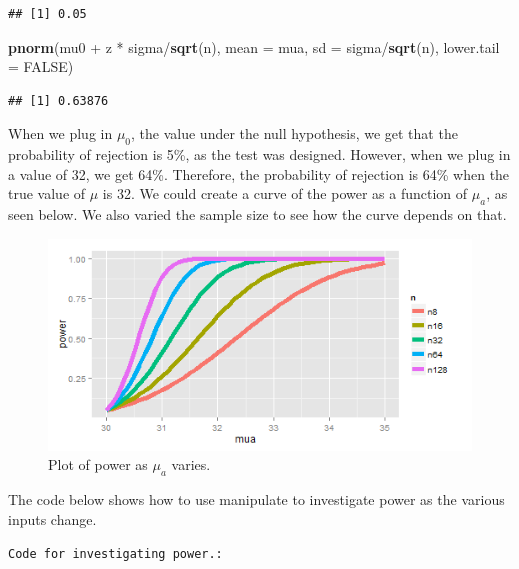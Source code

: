 \documentclass[]{article}
\newenvironment{Shaded}{\begin{snugshade}}{\end{snugshade}}
\newcommand{\KeywordTok}[1]{\textcolor[rgb]{0.13,0.29,0.53}{\textbf{{#1}}}}
\newcommand{\DataTypeTok}[1]{\textcolor[rgb]{0.13,0.29,0.53}{{#1}}}
\newcommand{\StringTok}[1]{\textcolor[rgb]{0.31,0.60,0.02}{{#1}}}
\newcommand{\OtherTok}[1]{\textcolor[rgb]{0.56,0.35,0.01}{{#1}}}
\newcommand{\NormalTok}[1]{{#1}}
\begin{document}
\begin{verbatim}
## [1] 0.05
\end{verbatim}

\begin{Shaded}
\begin{Highlighting}[]
\KeywordTok{pnorm}\NormalTok{(mu0 +}\StringTok{ }\NormalTok{z *}\StringTok{ }\NormalTok{sigma/}\KeywordTok{sqrt}\NormalTok{(n), }\DataTypeTok{mean =} \NormalTok{mua, }\DataTypeTok{sd =} \NormalTok{sigma/}\KeywordTok{sqrt}\NormalTok{(n),}
      \DataTypeTok{lower.tail =} \OtherTok{FALSE}\NormalTok{)}
\end{Highlighting}
\end{Shaded}

\begin{verbatim}
## [1] 0.63876
\end{verbatim}

When we plug in $\mu_0$, the value under the null hypothesis, we get
that the probability of rejection is 5\%, as the test was designed.
However, when we plug in a value of 32, we get 64\%. Therefore, the
probability of rejection is 64\% when the true value of $\mu$ is 32. We
could create a curve of the power as a function of $\mu_a$, as seen
below. We also varied the sample size to see how the curve depends on
that.

\begin{figure}[htbp]
\centering
\includegraphics{LeanPub/images/powerCurve-1.png}
\caption{Plot of power as $\mu_a$ varies.}
\end{figure}

The code below shows how to use manipulate to investigate power as the
various inputs change.

\vspace{1pc}

\verb;Code for investigating power.:;
\end{document}
